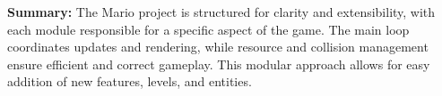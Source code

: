 \begin{flushleft}
\textbf{Summary:}  
The Mario project is structured for clarity and extensibility, with each module responsible for a specific aspect of the game. The main loop coordinates updates and rendering, while resource and collision management ensure efficient and correct gameplay. This modular approach allows for easy addition of new features, levels, and entities.

\end{flushleft}